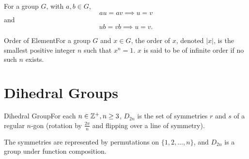 \documentclass{report}
\newcommand{\mprop}[2]{\begin{Prop}{#1}{}#2\end{Prop}}
\newcommand{\dfn}[2]{\begin{Definition}[colbacktitle=red!75!black]{#1}{}#2\end{Definition}}
\begin{document}
\mprop{}{For a group $G$, with $a,b \in G$, $$au = av \implies u = v$$ and $$ub = vb \implies u = v.$$}
\dfn{Order of Element}{For a group $G$ and $x \in G$, the order of $x$, denoted $|x|$, is the smallest positive integer $n$ such that $x^n = 1$. $x$ is said to be of infinite order if no such $n$ exists. }
\section{Dihedral Groups}
\dfn{Dihedral Group}{For each $n \in \mathbb{Z}^+, n \geq 3$, $D_{2n}$ is the set of symmetries $r$ and $s$ of a regular $n$-gon (rotation by $\frac{2\pi}{n}$ and flipping over a line of symmetry).}
The symmetries are represented by permutations on $\{1, 2, \dots, n \}$, and $D_{2n}$ is a group under function composition. 

\begin{figure}[h]
  \centering
\end{figure}
\end{document}

